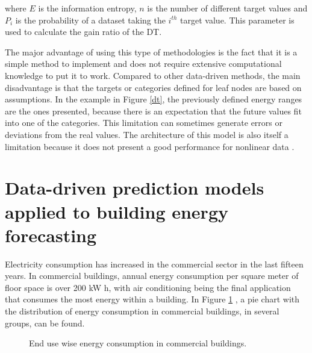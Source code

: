 where $E$ is the information entropy, $n$ is the number of different target values and $P_i$ is the probability of a dataset taking the $i^{th}$ target value. This parameter is used to calculate the gain ratio of the \ac{DT}.

The major advantage of using this type of methodologies is the fact that it is a simple method to implement and does not require extensive computational knowledge to put it to work. Compared to other data-driven methods, the main disadvantage is that the targets or categories defined for leaf nodes are based on assumptions. In the example in Figure \ref{dt}, the previously defined energy ranges are the ones presented, because there is an expectation that the future values fit into one of the categories. 
This limitation can sometimes generate errors or deviations from the real values. The architecture of this model is also itself a limitation because it does not present a good performance for nonlinear data \cite{dt2}.


\section{Data-driven prediction models applied to building energy forecasting \label{c}}


Electricity consumption has increased in the commercial sector in the last fifteen years.  In commercial buildings, annual energy consumption per square meter of floor space is over 200 kW h, with air conditioning being the final application that consumes the most energy within a building\cite{pie_1}. In Figure \ref{buildingenergy} \cite{pie_1}, a pie chart with the distribution of energy consumption in commercial buildings, in several groups, can be found.


\begin{figure}[h!]
    \centering
    \begin{center}
    \caption{End use wise energy consumption in commercial buildings.}
    \label{buildingenergy}
    \end{center}
\end{figure}


